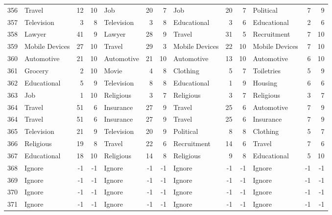 \begin{figure}[htbp]
\begin{tabular}{rlrrlrrlrrlrr}
    356   & Travel & 12    & 10    & Job   & 20    & 7     & Job   & 20    & 7     & Political & 7     & 9 \\
    357   & Television & 3     & 8     & Television & 3     & 8     & Educational & 3     & 6     & Educational & 2     & 6 \\
    358   & Lawyer & 41    & 9     & Lawyer & 28    & 9     & Travel & 31    & 5     & Recruitment & 7     & 10 \\
    359   & Mobile Devices & 27    & 10    & Travel & 29    & 3     & Mobile Devices & 22    & 10    & Mobile Devices & 7     & 10 \\
    360   & Automotive & 21    & 10    & Automotive & 21    & 10    & Automotive & 13    & 10    & Automotive & 6     & 10 \\
    361   & Grocery & 2     & 10    & Movie & 4     & 8     & Clothing & 5     & 7     & Toiletries & 5     & 9 \\
    362   & Educational & 5     & 9     & Television & 8     & 8     & Educational & 1     & 9     & Housing & 6     & 6 \\
    363   & Job   & 1     & 10    & Religious & 3     & 7     & Religious & 3     & 7     & Religious & 3     & 7 \\
    364   & Travel & 51    & 6     & Insurance & 27    & 9     & Travel & 25    & 6     & Automotive & 7     & 9 \\
    364   & Travel & 51    & 6     & Insurance & 27    & 9     & Travel & 25    & 6     & Insurance & 7     & 9 \\
    365   & Television & 21    & 9     & Television & 20    & 9     & Political & 8     & 8     & Clothing & 5     & 7 \\
    366   & Religious & 19    & 8     & Travel & 22    & 6     & Recruitment & 14    & 6     & Travel & 7     & 6 \\
    367   & Educational & 18    & 10    & Religious & 14    & 8     & Religious & 9     & 8     & Educational & 5     & 10 \\
    368   & Ignore & -1    & -1    & Ignore & -1    & -1    & Ignore & -1    & -1    & Ignore & -1    & -1 \\
    369   & Ignore & -1    & -1    & Ignore & -1    & -1    & Ignore & -1    & -1    & Ignore & -1    & -1 \\
    370   & Ignore & -1    & -1    & Ignore & -1    & -1    & Ignore & -1    & -1    & Ignore & -1    & -1 \\
    371   & Ignore & -1    & -1    & Ignore & -1    & -1    & Ignore & -1    & -1    & Ignore & -1    & -1 \\

\end{tabular}
\end{figure}
